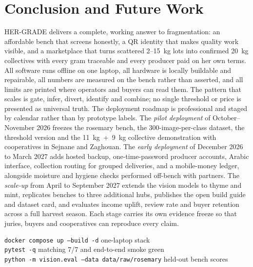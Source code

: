 \documentclass[10pt,conference,a4paper]{IEEEtran}
\begin{document}
\section{Conclusion and Future Work}
HER-GRADE delivers a complete, working answer to fragmentation: an affordable bench that screens honestly, a QR identity that makes quality work visible, and a marketplace that turns scattered 2--15~kg lots into confirmed 20~kg collectives with every gram traceable and every producer paid on her own terms. All software runs offline on one laptop, all hardware is locally buildable and repairable, all numbers are measured on the bench rather than asserted, and all limits are printed where operators and buyers can read them. The pattern that scales is gate, infer, divert, identify and combine; no single threshold or price is presented as universal truth.
The deployment roadmap is professional and staged by calendar rather than by prototype labels. The \textit{pilot deployment} of October--November 2026 freezes the rosemary bench, the 300-image-per-class dataset, the threshold version and the 11~kg~+~9~kg collective demonstration with cooperatives in Sejnane and Zaghouan. The \textit{early deployment} of December 2026 to March 2027 adds hosted backup, one-time-password producer accounts, Arabic interface, collection routing for grouped deliveries, and a mobile-money ledger, alongside moisture and hygiene checks performed off-bench with partners. The \textit{scale-up} from April to September 2027 extends the vision models to thyme and mint, replicates benches to three additional hubs, publishes the open build guide and dataset card, and evaluates income uplift, review rate and buyer retention across a full harvest season. Each stage carries its own evidence freeze so that juries, buyers and cooperatives can reproduce every claim.
\begin{tcolorbox}[colback=white,colframe=hergold,title=Reproduce the full chain in three commands,fonttitle=\bfseries\small]
\texttt{docker compose up --build -d} \quad one-laptop stack \\
\texttt{pytest -q} \quad matching 7/7 and end-to-end smoke green \\
\texttt{python -m vision.eval --data data/raw/rosemary} \quad held-out bench scores
\end{tcolorbox}
\end{document}
